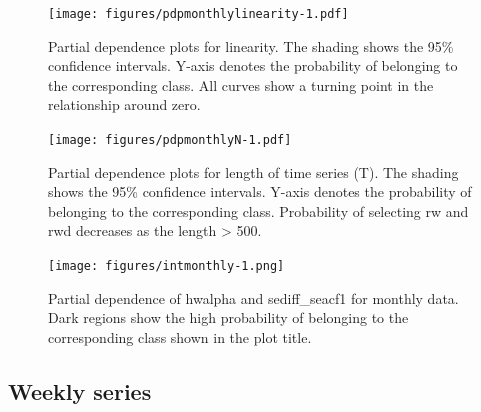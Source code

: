\documentclass[11pt,a4paper,]{article}
\begin{document}
\begin{figure}
\centering
\texttt{[image: figures/pdpmonthlylinearity-1.pdf]}
\caption{\label{fig:pdpmonthlylinearity}Partial dependence plots for linearity. The shading shows the 95\% confidence intervals. Y-axis denotes the probability of belonging to the corresponding class. All curves show a turning point in the relationship around zero.}
\end{figure}

\begin{figure}
\centering
\texttt{[image: figures/pdpmonthlyN-1.pdf]}
\caption{\label{fig:pdpmonthlyN}Partial dependence plots for length of time series (T). The shading shows the 95\% confidence intervals. Y-axis denotes the probability of belonging to the corresponding class. Probability of selecting rw and rwd decreases as the length \textgreater{} 500.}
\end{figure}

\begin{figure}
\centering
\texttt{[image: figures/intmonthly-1.png]}
\caption{\label{fig:intmonthly}Partial dependence of hwalpha and sediff\_seacf1 for monthly data. Dark regions show the high probability of belonging to the corresponding class shown in the plot title.}
\end{figure}

\hypertarget{weekly-series}{%
\subsection{Weekly series}\label{weekly-series}}
\end{document}
